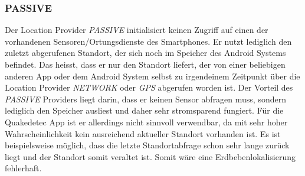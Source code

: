 \subsubsection{PASSIVE}
Der Location Provider \textit{PASSIVE} initialisiert keinen Zugriff auf einen der vorhandenen Sensoren/Ortungsdienste des Smartphones. Er nutzt lediglich den zuletzt abgerufenen Standort, der sich noch im Speicher des Android Systems befindet. Das heisst, dass er nur den Standort liefert, der von einer beliebigen anderen App oder dem Android System selbst zu irgendeinem Zeitpunkt über die Location Provider \textit{NETWORK} oder \textit{GPS} abgerufen worden ist. Der Vorteil des \textit{PASSIVE} Providers liegt darin, dass er keinen Sensor abfragen muss, sondern lediglich den Speicher ausliest und daher sehr stromsparend fungiert. Für die Quakedetec App ist er allerdings nicht sinnvoll verwendbar, da mit sehr hoher Wahrscheinlichkeit kein ausreichend aktueller Standort vorhanden ist. Es ist beispielsweise möglich, dass die letzte Standortabfrage schon sehr lange zurück liegt und der Standort somit veraltet ist.
Somit wäre eine Erdbebenlokalisierung fehlerhaft.

